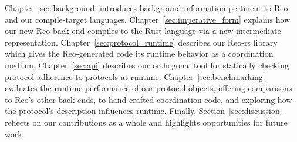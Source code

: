 Chapter~\ref{sec:background} introduces background information pertinent to Reo and our compile-target languages. Chapter~\ref{sec:imperative_form} explains how our new Reo back-end compiles to the Rust language via a new intermediate representation. Chapter~\ref{sec:protocol_runtime} describes our Reo-rs library which gives the Reo-generated code its runtime behavior as a coordination medium. Chapter~\ref{sec:api} describes our orthogonal tool for statically checking protocol adherence to protocols at runtime. Chapter~\ref{sec:benchmarking} evaluates the runtime performance of our protocol objects, offering comparisons to Reo's other back-ends, to hand-crafted coordination code, and exploring how the protocol's description influences runtime. Finally, Section~\ref{sec:discussion} reflects on our contributions as a whole and highlights opportunities for future work.

